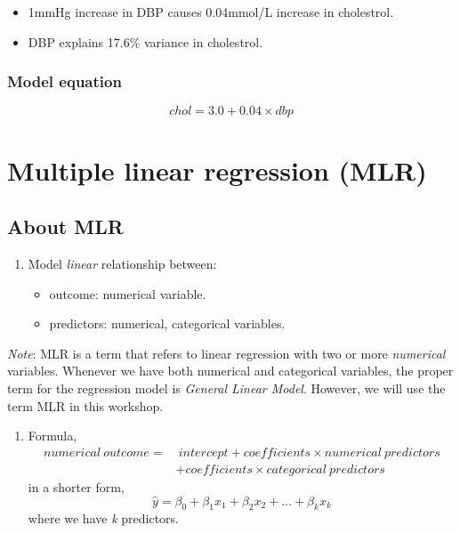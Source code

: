 \documentclass[
]{book}
\providecommand{\tightlist}{%
  \setlength{\itemsep}{0pt}\setlength{\parskip}{0pt}}
\renewenvironment{quote}{\begin{VF}}{\end{VF}}
\begin{document}
\begin{itemize}
\tightlist
\item
  1mmHg increase in DBP causes 0.04mmol/L increase in cholestrol.
\item
  DBP explains 17.6\% variance in cholestrol.
\end{itemize}

\hypertarget{model-equation}{%
\subsubsection{Model equation}\label{model-equation}}

\[chol = 3.0 + 0.04\times dbp\]

\hypertarget{multiple-linear-regression-mlr}{%
\section{Multiple linear regression (MLR)}\label{multiple-linear-regression-mlr}}

\hypertarget{about-mlr}{%
\subsection{About MLR}\label{about-mlr}}

\begin{enumerate}
\def\labelenumi{\arabic{enumi}.}
\item
  Model \emph{linear} relationship between:

  \begin{itemize}
  \tightlist
  \item
    outcome: numerical variable.
  \item
    predictors: numerical, categorical variables.
  \end{itemize}
\end{enumerate}

\begin{quote}
\emph{Note}: MLR is a term that refers to linear regression with two or more \emph{numerical} variables. Whenever we have both numerical and categorical variables, the proper term for the regression model is \emph{General Linear Model}. However, we will use the term MLR in this workshop.
\end{quote}

\begin{enumerate}
\def\labelenumi{\arabic{enumi}.}
\setcounter{enumi}{1}
\tightlist
\item
  Formula,
  \[\begin{aligned}
  numerical\ outcome = &\ intercept + coefficients \times numerical\ predictors \\
  & + coefficients \times categorical\ predictors
  \end{aligned}\]
  in a shorter form,
  \[\hat y = \beta_0 + \beta_1x_1 + \beta_2x_2 + ... + \beta_kx_k\]
  where we have \emph{k} predictors.
\end{enumerate}
\end{document}
